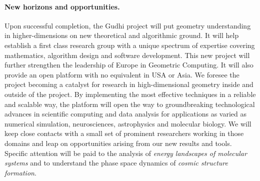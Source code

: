 



\vspace{-3mm}

\paragraph{New horizons and opportunities.} 




Upon successful completion, the Gudhi project will put geometry understanding in higher-dimensions on new theoretical and algorithmic ground. It will help establish a first class research group with a unique spectrum of expertise covering mathematics, algorithm design and software development.  This new project will further strengthen the leadership of Europe in Geometric Computing.  It will also provide an open platform with no equivalent in USA or Asia.  We foresee the project becoming a catalyst for research in high-dimensional geometry inside and outside of the project.  By implementing the most effective techniques in a reliable and scalable way, the platform will open the way to groundbreaking technological advances in scientific computing and data analysis for applications as varied as numerical simulation, neurosciences, astrophysics and molecular biology. We will keep close contacts with a small set of prominent researchers working in those domains and leap on opportunities arising from our new results and tools.  Specific attention will be paid to the analysis of {\em energy landscapes of molecular systems} and to understand the phase space dynamics of {\em cosmic structure formation}.

